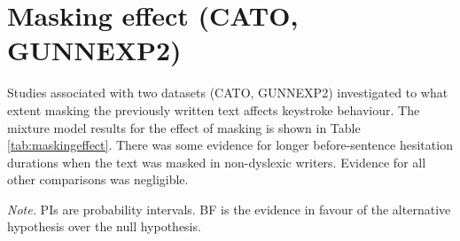 \documentclass[
  man,floatsintext]{apa7}
\begin{document}
\hypertarget{masking-effect-cato-gunnexp2}{%
\section{Masking effect (CATO, GUNNEXP2)}\label{masking-effect-cato-gunnexp2}}

Studies associated with two datasets (CATO, GUNNEXP2) investigated to what extent masking the previously written text affects keystroke behaviour. The mixture model results for the effect of masking is shown in Table \ref{tab:maskingeffect}. There was some evidence for longer before-sentence hesitation durations when the text was masked in non-dyslexic writers. Evidence for all other comparisons was negligible.

\begin{landscape}

\begin{center}
\begin{ThreePartTable}

\begin{TableNotes}[para]
\normalsize{\textit{Note.} PIs are probability intervals. BF is the evidence in favour of the alternative hypothesis over the null hypothesis.}
\end{TableNotes}

\footnotesize{

}
\end{ThreePartTable}
\end{center}
\end{landscape}
\end{document}
